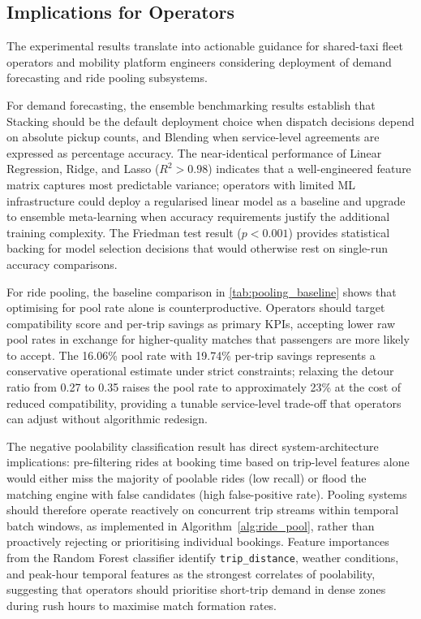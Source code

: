 \subsection{Implications for Operators}

The experimental results translate into actionable guidance for shared-taxi fleet operators and mobility platform engineers considering deployment of demand forecasting and ride pooling subsystems.

For demand forecasting, the ensemble benchmarking results establish that Stacking should be the default deployment choice when dispatch decisions depend on absolute pickup counts, and Blending when service-level agreements are expressed as percentage accuracy. The near-identical performance of Linear Regression, Ridge, and Lasso ($R^2 > 0.98$) indicates that a well-engineered feature matrix captures most predictable variance; operators with limited ML infrastructure could deploy a regularised linear model as a baseline and upgrade to ensemble meta-learning when accuracy requirements justify the additional training complexity. The Friedman test result ($p < 0.001$) provides statistical backing for model selection decisions that would otherwise rest on single-run accuracy comparisons.

For ride pooling, the baseline comparison in \autoref{tab:pooling_baseline} shows that optimising for pool rate alone is counterproductive. Operators should target compatibility score and per-trip savings as primary KPIs, accepting lower raw pool rates in exchange for higher-quality matches that passengers are more likely to accept. The 16.06\% pool rate with 19.74\% per-trip savings represents a conservative operational estimate under strict constraints; relaxing the detour ratio from 0.27 to 0.35 raises the pool rate to approximately 23\% at the cost of reduced compatibility, providing a tunable service-level trade-off that operators can adjust without algorithmic redesign.

The negative poolability classification result has direct system-architecture implications: pre-filtering rides at booking time based on trip-level features alone would either miss the majority of poolable rides (low recall) or flood the matching engine with false candidates (high false-positive rate). Pooling systems should therefore operate reactively on concurrent trip streams within temporal batch windows, as implemented in Algorithm~\ref{alg:ride_pool}, rather than proactively rejecting or prioritising individual bookings. Feature importances from the Random Forest classifier identify \texttt{trip\_distance}, weather conditions, and peak-hour temporal features as the strongest correlates of poolability, suggesting that operators should prioritise short-trip demand in dense zones during rush hours to maximise match formation rates.

